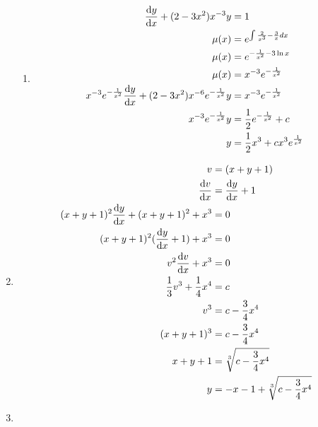 \documentclass[10pt,\jkfside,a4paper]{article}
\begin{document}
\begin{enumerate}
\begin{enumerate}
\item 
\begin{equation}
\begin{split}
\dv{y}{x} + (2 - 3x^2)x^{-3}y &= 1\\
\mu(x) &= e^{\int \frac{2}{x^3} - \frac{3}{x}dx}\\
\mu(x) &= e^{-\frac{1}{x^2} - 3\ln{x}}\\
\mu(x) &= x^{-3}e^{-\frac{1}{x^2}}\\
x^{-3}e^{-\frac{1}{x^2}}\dv{y}{x} + (2 - 3x^2)x^{-6}e^{-\frac{1}{x^2}}y &= x^{-3}e^{-\frac{1}{x^2}}\\
x^{-3}e^{-\frac{1}{x^2}}y &= \frac{1}{2}e^{-\frac{1}{x^2}} + c\\
y &= \frac{1}{2}x^3 + cx^3e^{\frac{1}{x^2}}\\
\end{split}
\end{equation}

\end{enumerate}

\item
\begin{equation}
\begin{split}
v &= (x + y + 1)\\
\dv{v}{x} &= \dv{y}{x} + 1\\
(x + y + 1)^2\dv{y}{x} + (x + y + 1)^2 + x^3 &= 0\\
(x + y + 1)^2(\dv{y}{x} + 1) + x^3 &= 0\\
v^2\dv{v}{x} + x^3 &= 0\\
\frac{1}{3}v^3 + \frac{1}{4}x^4 &= c\\
v^3 &= c - \frac{3}{4}x^4\\
(x + y + 1)^3 &= c - \frac{3}{4}x^4\\
x + y + 1 &= \sqrt[3]{c - \frac{3}{4}x^4}\\
y &= -x - 1 + \sqrt[3]{c - \frac{3}{4}x^4}\\
\end{split}
\end{equation}

\item
\begin{enumerate}


\end{enumerate}
\end{enumerate}
\end{document}

